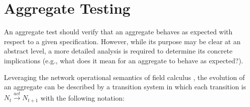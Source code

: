 \section{Aggregate Testing}
\label{section:analysis:aggregate-testing}

An aggregate test should verify that an aggregate behaves as expected with
respect to a given specification. However, while its purpose may be clear at an
abstract level, a more detailed analysis is required to determine its concrete
implications (e.g., what does it mean for an aggregate to behave as expected?).

Leveraging the network operational semantics of field calculus
\cite{CAS-AggregateComputingBlocks}, the evolution of an aggregate can be
described by a transition system in which each transition is $N_{t}
\xrightarrow{act} N_{t+1}$ with the following notation:

\begin{figure}[!ht]
  \centering
  \noindent\setlength{\fboxsep}{0pt}
\end{figure}


